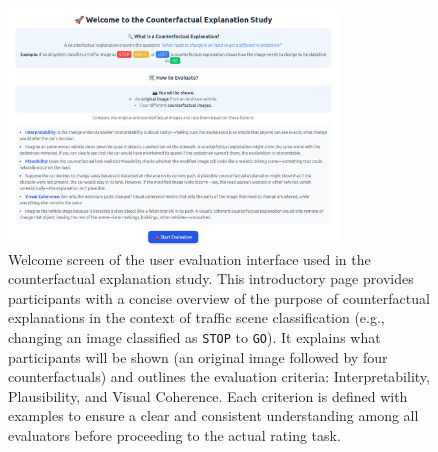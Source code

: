 \begin{figure}
    \centering
    \includegraphics[width=0.78\textwidth]{img/web_app_screenshots/form_ui_info.png}
    \caption{Welcome screen of the user evaluation interface used in the counterfactual explanation study. This introductory page provides participants with a concise overview of the purpose of counterfactual explanations in the context of traffic scene classification (e.g., changing an image classified as \texttt{STOP} to \texttt{GO}). It explains what participants will be shown (an original image followed by four counterfactuals) and outlines the evaluation criteria: Interpretability, Plausibility, and Visual Coherence. Each criterion is defined with examples to ensure a clear and consistent understanding among all evaluators before proceeding to the actual rating task.}
    \label{fig:app:form_ui}
\end{figure}